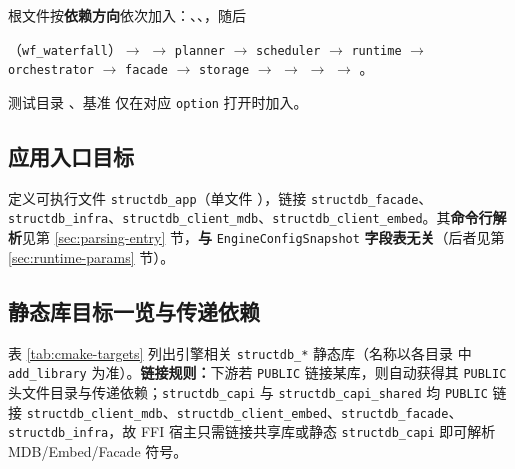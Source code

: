 根文件按\textbf{依赖方向}依次加入：、、，随后

（\texttt{wf\_waterfall}）$\rightarrow$  $\rightarrow$ \texttt{planner} $\rightarrow$ \texttt{scheduler} $\rightarrow$ \texttt{runtime} $\rightarrow$ \texttt{orchestrator} $\rightarrow$ \texttt{facade} $\rightarrow$ \texttt{storage} $\rightarrow$  $\rightarrow$  $\rightarrow$  $\rightarrow$ 。

测试目录 、基准  仅在对应 \texttt{option} 打开时加入。

\subsection{应用入口目标}

 定义可执行文件 \texttt{structdb\_app}（单文件 ），链接 \texttt{structdb\_facade}、\texttt{structdb\_infra}、\texttt{structdb\_client\_mdb}、\texttt{structdb\_client\_embed}。其\textbf{命令行解析}见第 \ref{sec:parsing-entry} 节，\textbf{与} \texttt{EngineConfigSnapshot} \textbf{字段表无关}（后者见第 \ref{sec:runtime-params} 节）。

\subsection{静态库目标一览与传递依赖}

表 \ref{tab:cmake-targets} 列出引擎相关 \texttt{structdb\_*} 静态库（名称以各目录  中 \texttt{add\_library} 为准）。\textbf{链接规则：}下游若 \texttt{PUBLIC} 链接某库，则自动获得其 \texttt{PUBLIC} 头文件目录与传递依赖；\texttt{structdb\_capi} 与 \texttt{structdb\_capi\_shared} 均 \texttt{PUBLIC} 链接 \texttt{structdb\_client\_mdb}、\texttt{structdb\_client\_embed}、\texttt{structdb\_facade}、\texttt{structdb\_infra}，故 FFI 宿主只需链接共享库或静态 \texttt{structdb\_capi} 即可解析 MDB/Embed/Facade 符号。

